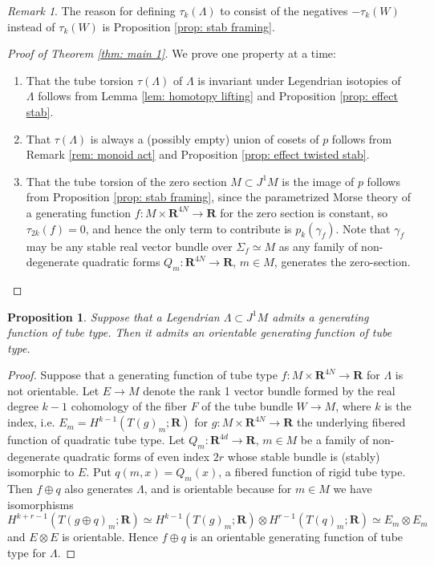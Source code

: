 \documentclass{amsart}
\def\bR{\mathbf{R}}
\newtheorem{proposition}[theorem]{Proposition}
\theoremstyle{definition}
\theoremstyle{remark}
\newtheorem{inductive lemma}[theorem]{Inductive Lemma}
\newtheorem{remark}[theorem]{Remark}
\begin{document}
\begin{remark}
The reason for defining $\tau_k(\Lambda)$ to consist of the negatives $-\tau_k(W)$ instead of $\tau_k(W)$ is  Proposition \ref{prop: stab framing}.
\end{remark}

\begin{proof}[Proof of Theorem \ref{thm: main 1}]
We prove one property at a time:
\begin{enumerate}
\item That the tube torsion $\tau(\Lambda)$ of $\Lambda$ is invariant under Legendrian isotopies of $\Lambda$ follows from Lemma \ref{lem: homotopy lifting} and Proposition \ref{prop: effect stab}. 
\item That $\tau(\Lambda)$ is always a (possibly empty) union of cosets of $p$ follows from Remark \ref{rem: monoid act} and Proposition \ref{prop: effect twisted stab}. 
\item That the tube torsion of the zero section $M \subset J^1 M$ is the image of $p$ follows from Proposition \ref{prop: stab framing}, since the parametrized Morse theory of a generating function $f:M \times \bR^{4N} \to \bR$ for the zero section is constant, so $\tau_{2k}(f)=0$, and hence the only term to contribute is $p_k(\gamma_f)$. Note that $\gamma_f$ may be any stable real vector bundle over $\Sigma_f \simeq M$ as any family of non-degenerate quadratic forms $Q_m:\bR^{4N} \to \bR$, $m \in M$, generates the zero-section. 
\end{enumerate}
\end{proof}


\begin{proposition}\label{prop: or aut} Suppose that a Legendrian $\Lambda \subset J^1M$ admits a generating function of tube type. Then it admits an orientable generating function of tube type. \end{proposition}

\begin{proof}
Suppose that a generating function of tube type $f:M \times \bR^{4N} \to \bR$ for $\Lambda$ is not orientable. Let $E  \to M$ denote the rank 1 vector bundle formed by the real degree $k-1$ cohomology of the fiber $F$ of the tube bundle $W \to M$, where $k$ is the index, i.e. $E_m=H^{k-1}(T(g)_m;\bR)$ for $g:M \times \bR^{4N} \to \bR$ the underlying fibered function of quadratic tube type.  Let $Q_m:\bR^{4d} \to \bR$, $m \in M$ be a family of non-degenerate quadratic forms of even index $2r$ whose stable bundle is (stably) isomorphic to $E$. Put $q(m,x)=Q_m(x)$, a fibered function of rigid tube type. Then $f \oplus q$ also generates $\Lambda$, and is orientable because for $m \in M$ we have isomorphisms $$H^{k+r-1}(T(g \oplus q)_m ;\bR) \simeq H^{k-1}(T(g)_m;\bR) \otimes H^{r-1}(T(q)_m;\bR) \simeq E_m \otimes E_m$$ and $E \otimes E$ is orientable. Hence $f \oplus q$ is an orientable generating function of tube type for $\Lambda$. \end{proof} 
\end{document}
